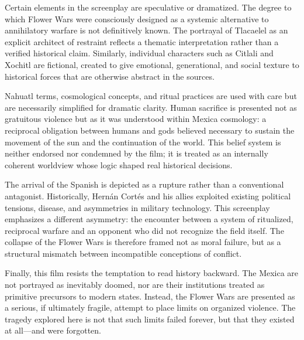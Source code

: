 \documentclass[12pt]{article}
\begin{document}
Certain elements in the screenplay are speculative or dramatized. The degree to which Flower Wars were consciously designed as a systemic alternative to annihilatory warfare is not definitively known. The portrayal of Tlacaelel as an explicit architect of restraint reflects a thematic interpretation rather than a verified historical claim. Similarly, individual characters such as Citlali and Xochitl are fictional, created to give emotional, generational, and social texture to historical forces that are otherwise abstract in the sources.

Nahuatl terms, cosmological concepts, and ritual practices are used with care but are necessarily simplified for dramatic clarity. Human sacrifice is presented not as gratuitous violence but as it was understood within Mexica cosmology: a reciprocal obligation between humans and gods believed necessary to sustain the movement of the sun and the continuation of the world. This belief system is neither endorsed nor condemned by the film; it is treated as an internally coherent worldview whose logic shaped real historical decisions.

The arrival of the Spanish is depicted as a rupture rather than a conventional antagonist. Historically, Hernán Cortés and his allies exploited existing political tensions, disease, and asymmetries in military technology. This screenplay emphasizes a different asymmetry: the encounter between a system of ritualized, reciprocal warfare and an opponent who did not recognize the field itself. The collapse of the Flower Wars is therefore framed not as moral failure, but as a structural mismatch between incompatible conceptions of conflict.

Finally, this film resists the temptation to read history backward. The Mexica are not portrayed as inevitably doomed, nor are their institutions treated as primitive precursors to modern states. Instead, the Flower Wars are presented as a serious, if ultimately fragile, attempt to place limits on organized violence. The tragedy explored here is not that such limits failed forever, but that they existed at all—and were forgotten.
\end{document}
